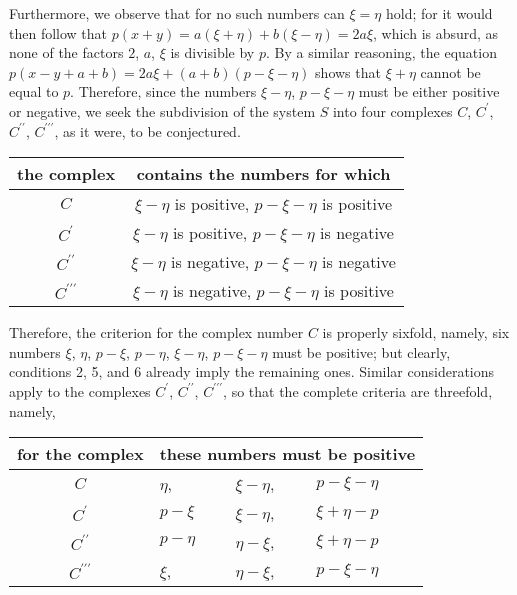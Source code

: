 \documentclass[twoside,12pt, showframe]{memoir}
\begin{document}
Furthermore, we observe that for no such numbers can \(\xi=\eta\) hold; for it would then follow that \(p(x+y)=a(\xi+\eta)+b(\xi-\eta)=2a\xi\), which is absurd, as none of the factors \(2\), \(a\), \(\xi\) is divisible by \(p\). By a similar reasoning, the equation \(p(x-y+a+b)=2a\xi+(a+b)(p-\xi-\eta)\) shows that \(\xi+\eta\) cannot be equal to \(p\). Therefore, since the numbers \(\xi-\eta\), \(p-\xi-\eta\) must be either positive or negative, we seek the subdivision of the system \(S\) into four complexes \(C\), \(C^{\prime}\), \(C^{\prime\prime}\), \(C^{\prime\prime\prime}\), as it were, to be conjectured.
\begin{center}
\begin{tabular}{c|c}
the complex & contains the numbers for which \\
\hline
\(C\) & \(\xi-\eta\) is positive, \(p-\xi-\eta\) is positive \\
\(C^{\prime}\) & \(\xi-\eta\) is positive, \(p-\xi-\eta\) is negative \\
\(C^{\prime \prime}\) & \(\xi-\eta\) is negative, \(p-\xi-\eta\) is negative \\
\(C^{\prime \prime \prime}\) & \(\xi-\eta\) is negative, \(p-\xi-\eta\) is positive \\
\end{tabular}
\end{center}
Therefore, the criterion for the complex number \(C\) is properly sixfold, namely, six numbers \(\xi\), \(\eta\), \(p-\xi\), \(p-\eta\), \(\xi-\eta\), \(p-\xi-\eta\) must be positive; but clearly, conditions 2, 5, and 6 already imply the remaining ones. Similar considerations apply to the complexes \(C^{\prime}\), \(C^{\prime\prime}\), \(C^{\prime\prime\prime}\), so that the complete criteria are threefold, namely,
\begin{center}
\begin{tabular}{c|lll}
for the complex & \multicolumn{3}{c}{these numbers must be positive}   \\
\hline
\(C\) & \(\eta\), & \(\xi-\eta\), & \(p-\xi-\eta\) \\
\(C^{\prime}\) & \(p-\xi\) & \(\xi-\eta\), & \(\xi+\eta-p\)   \\
\(C^{\prime \prime}\) & \(p-\eta\)& \(\eta-\xi\), & \(\xi+\eta-p\)   \\
\(C^{\prime \prime \prime}\) & \(\xi\), & \(\eta-\xi\), & \(p-\xi-\eta\) \\
\end{tabular}
\end{center}
%
\end{document}
